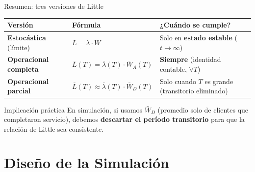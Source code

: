 \documentclass[aspectratio=1610, 9pt]{beamer}
\begin{document}
\begin{frame}{Resumen: tres versiones de Little}

\renewcommand{\arraystretch}{1.5}
\begin{center}
\begin{tabular}{p{3.5cm}p{4cm}p{4.5cm}}
\toprule
\textbf{Versión} & \textbf{Fórmula} & \textbf{¿Cuándo se cumple?} \\
\midrule
\textcolor{verdeoscuro}{\textbf{Estocástica}} (límite) & $L = \lambda \cdot W$ & Solo en \textbf{estado estable} ($t\to\infty$) \\
\textcolor{azuloscuro}{\textbf{Operacional completa}} & $\bar{L}(T) = \bar{\lambda}(T)\cdot\bar{W}_A(T)$ & \textbf{Siempre} (identidad contable, $\forall T$) \\
\textcolor{rojoclaro}{\textbf{Operacional parcial}} & $\bar{L}(T) \approx \bar{\lambda}(T)\cdot\bar{W}_D(T)$ & Solo cuando $T$ es grande (transitorio eliminado) \\
\bottomrule
\end{tabular}
\end{center}

\vspace{0.5cm}
\begin{block}{Implicación práctica}
En simulación, si usamos $\bar{W}_D$ (promedio solo de clientes que completaron servicio), debemos \textbf{descartar el período transitorio} para que la relación de Little sea consistente.
\end{block}
\end{frame}

\section{Diseño de la Simulación}
\end{document}
